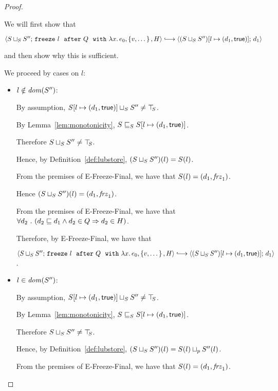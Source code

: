 \begin{proof}
\begin{itemize}
      We will first show that

      $\config{\lubstore{S}{S''}}{\freezeafterfull{l}{Q}{\lam{x}{e_0}}{\setof{v,
            \dots}}{H}} \parstepsto
      \config{\extS{(\lubstore{S}{S''})}{l}{d_1}{\frozentrue}}{d_1}$

      and then show why this is sufficient.

      We proceed by cases on $l$:
      \begin{itemize}
      \item $l \notin \mathit{dom}(S'')$:

        By assumption, $S[l \mapsto (d_1, \textsf{true})] \sqcup_{S} S''
        \neq \top\hspace{-0.85mm}_{S}$.

        By Lemma~\ref{lem:monotonicity},
        $S \sqsubseteq_S S[l \mapsto (d_1, \textsf{true})]$.

        Therefore $S \sqcup_{S} S'' \neq \top\hspace{-0.85mm}_{S}$.

        Hence, by Definition~\ref{def:lubstore},
        $(S \sqcup_{S} S'')(l) = S(l)$.

        From the premises of {\sc E-Freeze-Final}, we have that $S(l)
        = (d_1, \mathit{frz}_1)$.

        Hence $(S \sqcup_{S} S'')(l) = (d_1, \mathit{frz}_1)$.

        From the premises of {\sc E-Freeze-Final}, we have that
        $\forall{d_2} ~.~ ( {d_2 \sqsubseteq d_1 \land d_2 \in Q} \Rightarrow d_2 \in
        H)$.

        Therefore, by {\sc E-Freeze-Final}, we have that

        $\config{\lubstore{S}{S''}}{\freezeafterfull{l}{Q}{\lam{x}{e_0}}{\setof{v,
              \dots}}{H}} \parstepsto
        \config{\extS{(\lubstore{S}{S''})}{l}{d_1}{\frozentrue}}{d_1}$.


      \item $l \in \mathit{dom}(S'')$:

        By assumption, $S[l \mapsto (d_1, \textsf{true})] \sqcup_{S} S''
        \neq \top\hspace{-0.85mm}_{S}$.

        By Lemma~\ref{lem:monotonicity},
        $S \sqsubseteq_S S[l \mapsto (d_1, \textsf{true})]$.

        Therefore $S \sqcup_{S} S'' \neq \top\hspace{-0.85mm}_{S}$.

        Hence, by Definition~\ref{def:lubstore},
        $(S \sqcup_{S} S'')(l) = S(l) \sqcup_p S''(l)$.

        From the premises of {\sc E-Freeze-Final}, we have that
        $S(l) = (d_1, \mathit{frz}_1)$.


\end{itemize}
\end{itemize}
\end{proof}
